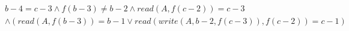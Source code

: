 \begin{align*}
%
& %
b - 4 = c - 3
%
\land
%
f(b - 3)  \neq  b - 2
%
\land
%
\mathit{read}(A,f(c - 2)) = c - 3
~\\~
& %
%
\land
%
(\mathit{read}(A,f(b - 3)) = b - 1 \lor \mathit{read}(\mathit{write}(A,b - 2,f(c - 3)),f(c - 2)) = c - 1)
%
\end{align*}
